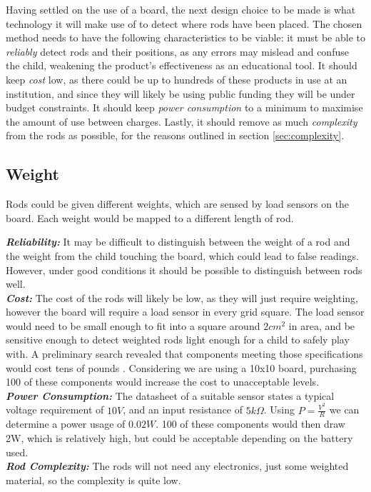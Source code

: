 Having settled on the use of a board, the next design choice to be made is what technology it will make use of to detect where rods have been placed. The chosen method needs to have the following characteristics to be viable: it must be able to \textit{reliably} detect rods and their positions, as any errors may mislead and confuse the child, weakening the product’s effectiveness as an educational tool. It should keep \textit{cost} low, as there could be up to hundreds of these products in use at an institution, and since they will likely be using public funding they will be under budget constraints. It should keep \textit{power consumption} to a minimum to maximise the amount of use between charges. Lastly, it should remove as much \textit{complexity} from the rods as possible, for the reasons outlined in section \ref{sec:complexity}. \\


\subsection{Weight}
\label{weight}

Rods could be given different weights, which are sensed by load sensors on the board. Each weight would be mapped to a different length of rod.\\

{
\setlength{\parindent}{0pt} %

\textbf{\textit{Reliability:}} It may be difficult to distinguish between the weight of a rod and the weight from the child touching the board, which could lead to false readings. However, under good conditions it should be possible to distinguish between rods well.\\

\textbf{\textit{Cost:}} The cost of the rods will likely be low, as they will just require weighting, however the board will require a load sensor in every grid square. The load sensor would need to be small enough to fit into a square around $2cm^2$ in area, and be sensitive enough to detect weighted rods light enough for a child to safely play with. A preliminary search revealed that components meeting those specifications would cost tens of pounds  \cite{ref:loadsensor}. Considering we are using a 10x10 board, purchasing 100 of these components would increase the cost to unacceptable levels.    \\

\textbf{\textit{Power Consumption:}} The datasheet of a suitable sensor \cite{MICROSWI18:online} states a typical voltage requirement of $10V$, and an input resistance of $5k\Omega$. Using $P=\frac{V^2}{R}$ we can determine a power usage of $0.02W$. 100 of these components would then draw 2W, which is relatively high, but could be acceptable depending on the battery used. \\

\textbf{\textit{Rod Complexity:}} The rods will not need any electronics, just some weighted material, so the complexity is quite low.\\
}

